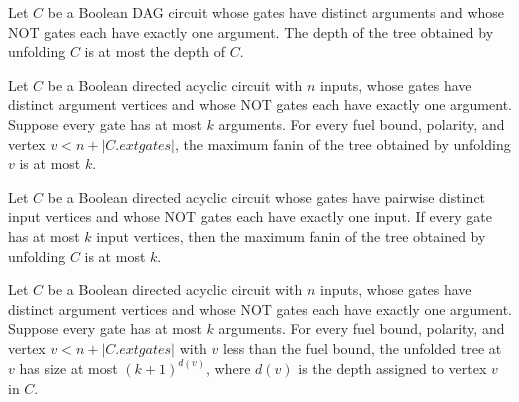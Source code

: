 \begin{theorem}
\label{BoolCircuit.DAGCircuit.toTree_depth_le}
\leanok
{}
Let $C$ be a Boolean DAG circuit whose gates have distinct arguments and whose NOT gates
each have exactly one argument. The depth of the tree obtained by unfolding $C$ is at
most the depth of $C$.
\end{theorem}

\begin{theorem}
\label{BoolCircuit.DAGCircuit.unfoldVertex_maxFanin_le}
\leanok
{}
Let $C$ be a Boolean directed acyclic circuit with $n$ inputs, whose gates have distinct
argument vertices and whose NOT gates each have exactly one argument. Suppose every gate
has at most $k$ arguments. For every fuel bound, polarity, and vertex
$v<n+|C.	ext{gates}|$, the maximum fanin of the tree obtained by unfolding $v$ is at
most $k$.
\end{theorem}

\begin{theorem}
\label{BoolCircuit.DAGCircuit.toTree_maxFanin_le}
\leanok
{}
Let $C$ be a Boolean directed acyclic circuit whose gates have pairwise distinct input
vertices and whose NOT gates each have exactly one input. If every gate has at most $k$
input vertices, then the maximum fanin of the tree obtained by unfolding $C$ is at most
$k$.
\end{theorem}

\begin{theorem}
\label{BoolCircuit.DAGCircuit.unfoldVertex_size_le}
\leanok
{}
Let $C$ be a Boolean directed acyclic circuit with $n$ inputs, whose gates have distinct
argument vertices and whose NOT gates each have exactly one argument. Suppose every gate
has at most $k$ arguments. For every fuel bound, polarity, and vertex
$v<n+|C.	ext{gates}|$ with $v$ less than the fuel bound, the unfolded tree at $v$ has
size at most $(k+1)^{d(v)}$, where $d(v)$ is the depth assigned to vertex $v$ in $C$.
\end{theorem}

